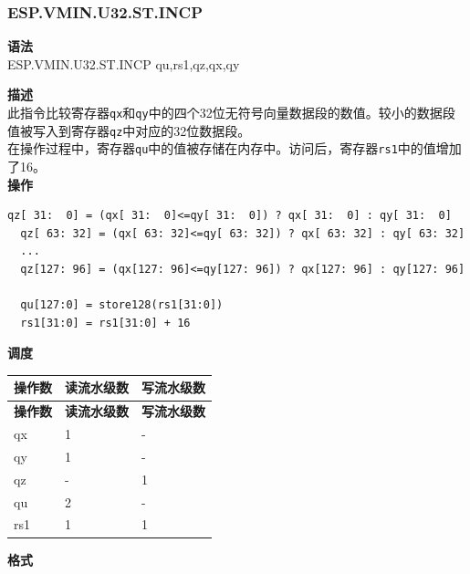 \newpage

\newpage
\subsubsection{ESP.VMIN.U32.ST.INCP}\label{instruction:ESPVMINU32STINCP}
\textbf{语法}\\
ESP.VMIN.U32.ST.INCP qu,rs1,qz,qx,qy

\textbf{描述}\\
此指令比较寄存器\lstinline{qx}和\lstinline{qy}中的四个32位无符号向量数据段的数值。较小的数据段值被写入到寄存器\lstinline{qz}中对应的32位数据段。\\在操作过程中，寄存器\lstinline{qu}中的值被存储在内存中。访问后，寄存器\lstinline{rs1}中的值增加了16。\\
\textbf{操作}
\begin{lstlisting}[escapeinside=`?]
  qz[ 31:  0] = (qx[ 31:  0]<=qy[ 31:  0]) ? qx[ 31:  0] : qy[ 31:  0]
  qz[ 63: 32] = (qx[ 63: 32]<=qy[ 63: 32]) ? qx[ 63: 32] : qy[ 63: 32]
  ...
  qz[127: 96] = (qx[127: 96]<=qy[127: 96]) ? qx[127: 96] : qy[127: 96]

  qu[127:0] = store128(rs1[31:0])
  rs1[31:0] = rs1[31:0] + 16
\end{lstlisting}


\textbf{调度}\\
\begin{longtable}[c]{|l|l|l|}
    \hline
    \rowcolor{lightgray}
    \textbf{操作数} & \textbf{读流水级数} & \textbf{写流水级数} \\\hline
    \endfirsthead
    \hline
    \rowcolor{lightgray}
     \textbf{操作数} & \textbf{读流水级数} & \textbf{写流水级数} \\\hline
    \endhead
    \hline
    \endfoot

    qx & 1 & - \\\hline
  qy & 1 & - \\\hline
     qz & - & 1 \\\hline
     qu & 2 & - \\\hline
     rs1 & 1 & 1

\end{longtable}

\textbf{格式}\\

